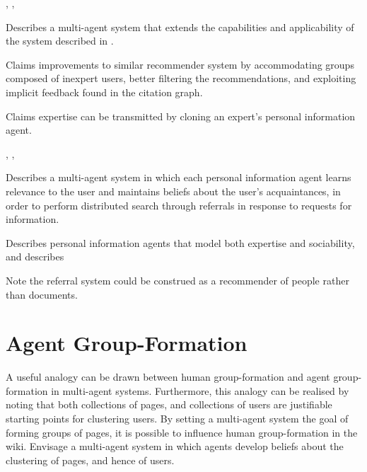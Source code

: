 %

\begin{albResearchNote}{%
    \citet{birukou06:_multi_agent_system_facil_scien_public_searc}%
  }{%
    ,
    ,
  }
\item Describes a multi-agent system that extends the capabilities and
  applicability of the system described in \citep{birukov05:_implic}.
\item Claims improvements to similar recommender system by accommodating
  groups composed of inexpert users, better filtering the
  recommendations, and exploiting implicit feedback found in the
  citation graph.
\item Claims expertise can be transmitted by cloning an expert's
  personal information agent.
\end{albResearchNote}

%

\begin{albResearchNote}{%
    \citet{yu03:_searc_social_networ}%
  }{%
    ,
    , %
  }
\item Describes a multi-agent system in which each personal information
  agent learns relevance to the user and maintains beliefs about the
  user's acquaintances, in order to perform distributed search through
  referrals in response to requests for information.
\item Describes personal information agents that model both expertise
  and sociability, and describes
\item Note the referral system could be construed as a recommender of
  people rather than documents.
\end{albResearchNote}

%
%
%

\section{Agent Group-Formation}
\label{sec:read_2007_11_26:agent-group-form}

A useful analogy can be drawn between human group-formation and agent
group-formation in multi-agent systems.  Furthermore, this analogy can
be realised by noting that both collections of pages, and collections of
users are justifiable starting points for clustering users.  By setting
a multi-agent system the goal of forming groups of pages, it is possible
to influence human group-formation in the wiki.  Envisage a multi-agent
system in which agents develop beliefs about the clustering of pages,
and hence of users.

